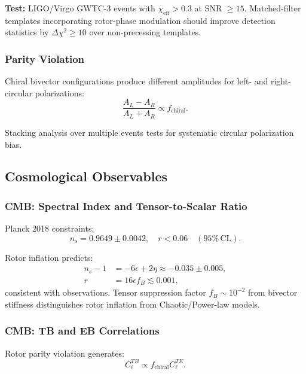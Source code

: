 \documentclass[11pt,a4paper]{article}
\numberwithin{equation}{section}
\theoremstyle{plain}
\theoremstyle{definition}
\theoremstyle{remark}
\begin{document}
\textbf{Test:} LIGO/Virgo GWTC-3 events with $\chi_{\mathrm{eff}} > 0.3$ at SNR $\geq 15$. Matched-filter templates incorporating rotor-phase modulation should improve detection statistics by $\Delta\chi^2 \geq 10$ over non-precessing templates.

\subsubsection{Parity Violation}

Chiral bivector configurations produce different amplitudes for left- and right-circular polarizations:
\begin{equation}
\frac{A_L - A_R}{A_L + A_R} \propto f_{\mathrm{chiral}}.
\end{equation}

Stacking analysis over multiple events tests for systematic circular polarization bias.

\subsection{Cosmological Observables}

\subsubsection{CMB: Spectral Index and Tensor-to-Scalar Ratio}

Planck 2018 constraints:
\begin{equation}
n_s = 0.9649 \pm 0.0042, \quad r < 0.06 \quad (95\%\,\mathrm{CL}).
\end{equation}

Rotor inflation predicts:
\begin{align}
n_s - 1 &= -6\epsilon + 2\eta \approx -0.035 \pm 0.005,\\
r &= 16\epsilon f_B \lesssim 0.001,
\end{align}
consistent with observations. Tensor suppression factor $f_B \sim 10^{-2}$ from bivector stiffness distinguishes rotor inflation from Chaotic/Power-law models.

\subsubsection{CMB: TB and EB Correlations}

Rotor parity violation generates:
\begin{equation}
C_\ell^{TB} \propto f_{\mathrm{chiral}} C_\ell^{TE}.
\end{equation}
\end{document}
